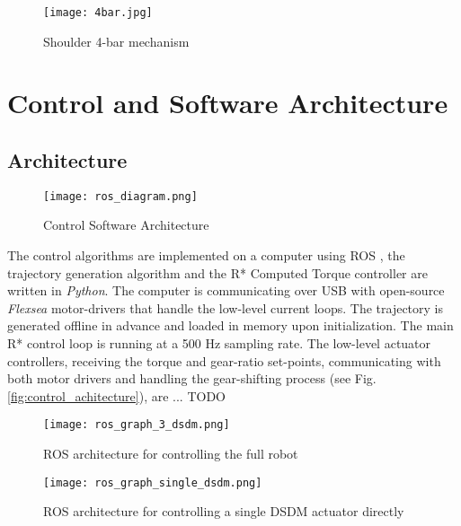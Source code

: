 \begin{figure}[H]
	\centering
		\texttt{[image: 4bar.jpg]}
	\caption{Shoulder 4-bar mechanism}
	\label{fig:4bar}
\end{figure}



\section{Control and Software Architecture}
\label{sec:ControlSoftwareArchitecture}

\subsection{Architecture}

\begin{figure}[H]
	\centering
		\texttt{[image: ros\_diagram.png]}
	\caption{Control Software Architecture}
	\label{fig:ros_diagram}
\end{figure}


The control algorithms are implemented on a computer using ROS \cite{quigley_ros:_2009}, the trajectory generation algorithm and the R* Computed Torque controller are written in \textit{Python}. The computer is communicating over USB with open-source \textit{Flexsea} motor-drivers that handle the low-level current loops. The trajectory is generated offline in advance and loaded in memory upon initialization. The main R* control loop is running at a 500 Hz sampling rate. The low-level actuator controllers, receiving the torque and gear-ratio set-points, communicating with both motor drivers and handling the gear-shifting process (see Fig. \ref{fig:control_achitecture}), are ... TODO


\begin{figure}[H]
	\centering
		\texttt{[image: ros\_graph\_3\_dsdm.png]}
	\caption{ROS architecture for controlling the full robot}
	\label{fig:ros_3dsdm}
\end{figure}


\begin{figure}[H]
	\centering
		\texttt{[image: ros\_graph\_single\_dsdm.png]}
	\caption{ROS architecture for controlling a single DSDM actuator directly}
	\label{fig:ros_dsdm}
\end{figure}


